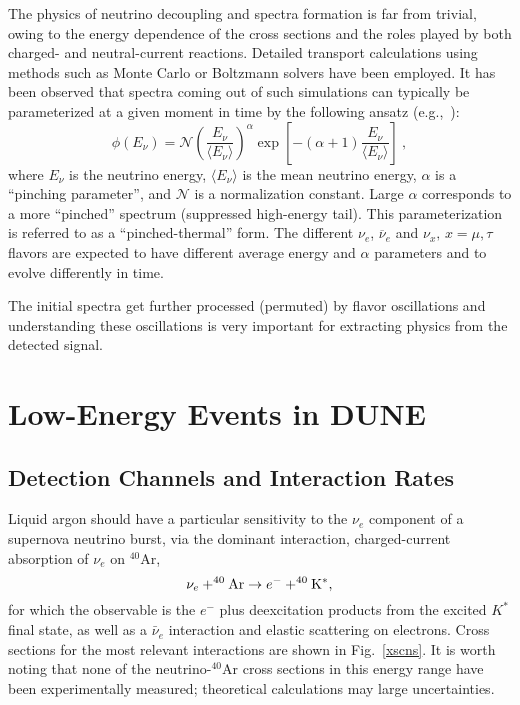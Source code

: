 The physics of neutrino decoupling and spectra formation is far from trivial, owing to the energy dependence of the cross sections and the roles played by both charged- and neutral-current reactions.
Detailed transport calculations using methods such as Monte Carlo or Boltzmann solvers have been employed. It has been observed that spectra coming out of such simulations can typically be parameterized at a given moment in time by the following ansatz (e.g.,~\cite{Minakata:2008nc,Tamborra:2012ac}):
\begin{equation}
        \label{eq:pinched}
        \phi(E_{\nu}) = \mathcal{N} 
        \left(\frac{E_{\nu}}{\langle E_{\nu} \rangle}\right)^{\alpha} \exp\left[-\left(\alpha + 1\right)\frac{E_{\nu}}{\langle E_{\nu} \rangle}\right] \ ,
\end{equation}
where $E_{\nu}$ is the neutrino energy, $\langle E_\nu \rangle$ is the
mean neutrino energy, $\alpha$ is a ``pinching parameter'', and
$\mathcal{N}$ is a normalization constant.
%
Large $\alpha$ corresponds to a more ``pinched'' spectrum (suppressed
high-energy tail). This parameterization is referred to as a
``pinched-thermal'' form. The different $\nu_e$, $\overline{\nu}_e$ and
$\nu_x, \, x = \mu, \tau$ flavors are expected to have different
average energy and $\alpha$ parameters and to evolve differently in
time. 

The initial spectra get further processed (permuted) by flavor oscillations and understanding these oscillations is very important for extracting physics from the detected signal.


\section{Low-Energy Events in DUNE}\label{sec:lowe-events}

\subsection{Detection Channels and Interaction Rates}

Liquid argon should have a particular sensitivity to the $\nu_e$
component of a supernova neutrino burst, via the dominant interaction,
charged-current
absorption of $\nu_e$ on $^{40}$Ar,
\begin{equation}
\nu_e + ^{40}{\rm Ar} \rightarrow e^- + ^{40}{\rm K^*},
\label{eq:nueabs}
\end{equation}
for which the observable is the $e^-$ plus deexcitation products from the excited $K^*$ final state, as well as a $\bar{\nu}_e$ interaction and elastic scattering on electrons.
Cross sections for the most
relevant interactions are shown in Fig.~\ref{xscns}.  It is worth
noting that none of the neutrino-$^{40}$Ar cross sections in this
energy range have been experimentally measured; theoretical
calculations may large uncertainties.

